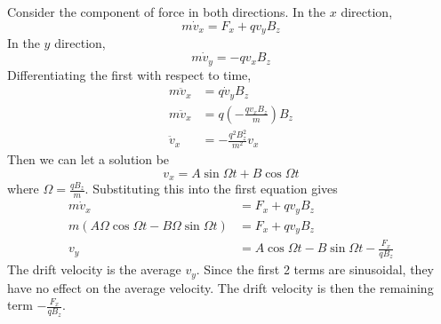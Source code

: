 \documentclass[answers]{exam}
\begin{document}
\begin{questions}

\begin{solution}
    Consider the component of force in both directions. In the $x$ direction,
    $$m\dot v_x = F_x + q v_y B_z$$
    In the $y$ direction,
    $$m\dot v_y = -qv_xB_z$$
    Differentiating the first with respect to time,
    \begin{align*}
        m\ddot v_x &= q\dot v_yB_z \\
        m\ddot v_x &= q\left(-\frac{qv_xB_z}{m}\right)B_z \\
        \ddot v_x &= -\frac{q^2B_z^2}{m^2}v_x
    \end{align*}
    Then we can let a solution be
    $$v_x = A\sin\Omega t + B\cos\Omega t$$
    where $\Omega = \frac{qB_z}{m}$.
    Substituting this into the first equation gives
    \begin{align*}
        m\dot v_x &= F_x + q v_y B_z \\
        m(A\Omega\cos\Omega t - B\Omega\sin\Omega t) &= F_x + q v_y B_z \\
        v_y &= A\cos\Omega t - B\sin\Omega t - \frac{F_x}{qB_z}
    \end{align*}
    The drift velocity is the average $v_y$. Since the first 2 terms are sinusoidal, they have no effect on the average velocity. The drift velocity is then the remaining term $-\frac{F_x}{qB_z}$.
\end{solution}




\end{questions}
\end{document}
